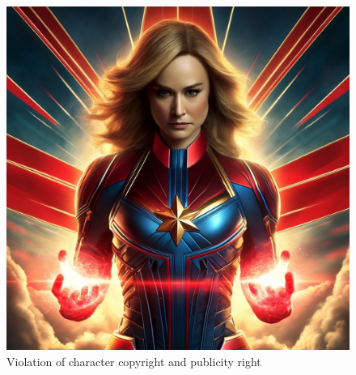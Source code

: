 
\begin{figure}
  \vspace{-0.4in}
  \begin{center}
    \includegraphics[width=0.98\linewidth]{figure_folder/possible_risk.png}
  \end{center}
  \vspace{-0.1in}
  \caption{\small Violation of character copyright and publicity right}
  \label{figure:possible_risk}
\end{figure}